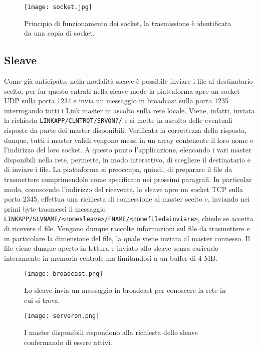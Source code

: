 \documentclass[11pt,fleqn]{book} %
\begin{document}
\begin{figure}[h]
    \centering
    \texttt{[image: socket.jpg]}
    \caption{Principio di funzionamento dei socket, la trasmissione è identificata da una copia di socket.}
    \label{fig:awesome_image}
\end{figure}


\subsection{Sleave}
Come già anticipato, nella modalità sleave è possibile inviare i file al destinatario scelto, per far questo entrati nella sleave mode la piattaforma apre un socket UDP sulla porta 1234 e invia un messaggio in broadcast sulla porta 1235 interrogando tutti i Link master in ascolto sulla rete locale.
Viene, infatti, inviata la richiesta \texttt{LINKAPP/CLNTRQT/SRVON?/} e si mette in ascolto delle eventuali risposte da parte dei master disponibili.
Verificata la correttezza della risposta, dunque, tutti i master validi vengono messi in un array contenente il loro nome e l'indirizzo del loro socket.
A questo punto l'applicazione, elencando i vari master disponibili nella rete, permette, in modo interattivo, di scegliere il destinatario e di inviare i file.
La piattaforma si preoccupa, quindi, di preparare il file da trasmettere comprimendolo come specificato nei prossimi paragrafi.
In particolar modo, conoscendo l'indirizzo del ricevente, lo sleave apre un socket TCP sulla porta 2345, effettua una richiesta di connessione al master scelto e, inviando nei primi byte trasmessi il messaggio \texttt{LINKAPP/SLVNAME/<nomesleave>/FNAME/<nomefiledainviare>}, chiede se accetta di ricevere il file.
Vengono dunque raccolte informazioni sul file da trasmettere e in particolare la dimensione del file, la quale viene inviata al master connesso.
Il file viene dunque aperto in lettura e inviato allo sleave senza caricarlo interamente in memoria centrale ma limitandosi a un buffer di 4 MB.

\begin{figure}[h]
	\centering
    \texttt{[image: broadcast.png]}
    \caption{Lo sleave invia un messaggio in broadcast per conoscere la rete in cui si trova.}
    \label{fig:awesome_image}
	\centering
    \texttt{[image: serveron.png]}
    \caption{I master disponibili rispondono alla richiesta dello sleave confermando di essere attivi.}
    \label{fig:awesome_image}
\end{figure}
\end{document}
